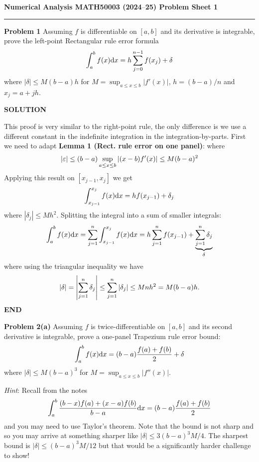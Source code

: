 \documentclass[12pt,a4paper]{article}
\def\endash{–}
\begin{document}
\textbf{Numerical Analysis MATH50003 (2024\ensuremath{\endash}25) Problem Sheet 1}

\rule{\textwidth}{1pt}
\textbf{Problem 1} Assuming $f$ is differentiable on $[a,b]$ and its derivative is integrable, prove the left-point Rectangular rule error formula
\[
\ensuremath{\int}_a^b f(x) {\rm d}x =  h \ensuremath{\sum}_{j=0}^{n-1} f(x_j) +  \ensuremath{\delta}
\]
where $|\ensuremath{\delta}| \ensuremath{\leq} M (b-a) h$ for $M = \sup_{a \ensuremath{\leq} x \ensuremath{\leq} b}|f'(x)|$, $h = (b-a)/n$ and $x_j = a + jh$.

\textbf{SOLUTION}

This proof is very similar to the right-point rule, the only difference is we use a different constant in the indefinite integration in the integration-by-parts. First we need to adapt \textbf{Lemma 1 (Rect. rule error on one panel)}:
where
\[
\left|{\varepsilon}\right| \leq (b-a) \sup_{a \leq x \leq b}|(x-b) f'(x)| \leq M (b-a)^2
\]
Applying this result on $[x_{j-1},x_j]$ we get
\[
\ensuremath{\int}_{x_{j-1}}^{x_j} f(x) {\rm d}x = h f(x_{j-1}) + \ensuremath{\delta}_j
\]
where $|\ensuremath{\delta}_j| \ensuremath{\leq} M h^2$. Splitting the integral into a sum of smaller integrals:
\[
\ensuremath{\int}_a^b f(x) {\rm d}x = \ensuremath{\sum}_{j=1}^n  \ensuremath{\int}_{x_{j-1}}^{x_j} f(x) {\rm d}x =
h \ensuremath{\sum}_{j=1}^n f(x_{j-1}) +  \underbrace{\ensuremath{\sum}_{j=1}^n \ensuremath{\delta}_j}_\ensuremath{\delta}
\]
where using the triangular inequality we have
\[
|\delta| = \left|{ \sum_{j=1}^n \delta_j}\right| \leq \sum_{j=1}^n |\delta_j| \leq M n h^2 = M(b-a)h.
\]
\textbf{END}

\textbf{Problem 2(a)}  Assuming $f$ is twice-differentiable on $[a,b]$ and its second derivative is integrable, prove a one-panel Trapezium rule error bound:
\[
\ensuremath{\int}_a^b f(x) {\rm d}x = (b-a) {f(a) + f(b) \over 2} +  \ensuremath{\delta}
\]
where $|\ensuremath{\delta}| \ensuremath{\leq} M (b-a)^3$ for $M = \sup_{a \ensuremath{\leq} x \ensuremath{\leq} b}|f''(x)|$.

\emph{Hint}: Recall from the notes
\[
\int_a^b {(b-x) f(a) + (x-a) f(b) \over b-a} {\rm d} x = (b-a) {f(a) + f(b) \over 2}
\]
and you may need to use Taylor's theorem. Note that the bound is not sharp and so you may arrive at something sharper like $|\ensuremath{\delta}| \ensuremath{\leq} 3(b-a)^3 M/4$. The sharpest bound is $|\ensuremath{\delta}| \ensuremath{\leq} (b-a)^3 M/12$ but that would be a significantly harder challenge to show!
\end{document}
